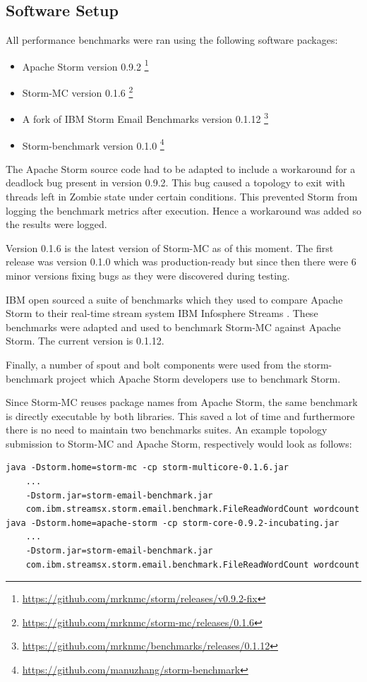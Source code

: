 \documentclass[bsc,logo,frontabs,twoside,singlespacing,normalheadings,parskip]{infthesis}\usepackage[]{graphicx}\usepackage[]{color}
\begin{document}
\subsection{Software Setup}

All performance benchmarks were ran using the following software packages:

\begin{itemize}
	\item Apache Storm version 0.9.2 \footnote{\url{https://github.com/mrknmc/storm/releases/v0.9.2-fix}}
	\item Storm-MC version 0.1.6 \footnote{\url{https://github.com/mrknmc/storm-mc/releases/0.1.6}}
	\item A fork of IBM Storm Email Benchmarks version 0.1.12 \footnote{\url{https://github.com/mrknmc/benchmarks/releases/0.1.12}}
	\item Storm-benchmark version 0.1.0 \footnote{\url{https://github.com/manuzhang/storm-benchmark}}
\end{itemize}

The Apache Storm source code had to be adapted to include a workaround for a deadlock bug present in version 0.9.2. This bug caused a topology to exit with threads left in Zombie state under certain conditions. This prevented Storm from logging the benchmark metrics after execution. Hence a workaround was added so the results were logged.

Version 0.1.6 is the latest version of Storm-MC as of this moment. The first release was version 0.1.0 which was production-ready but since then there were 6 minor versions fixing bugs as they were discovered during testing.

IBM open sourced a suite of benchmarks which they used to compare Apache Storm to their real-time stream system IBM Infosphere Streams \citep{InfoSphereStreams}. These benchmarks were adapted and used to benchmark Storm-MC against Apache Storm. The current version is 0.1.12.

Finally, a number of spout and bolt components were used from the storm-benchmark project which Apache Storm developers use to benchmark Storm.

Since Storm-MC reuses package names from Apache Storm, the same benchmark is directly executable by both libraries. This saved a lot of time and furthermore there is no need to maintain two benchmarks suites. An example topology submission to Storm-MC and Apache Storm, respectively would look as follows:

\begin{verbatim}
java -Dstorm.home=storm-mc -cp storm-multicore-0.1.6.jar
    ...
    -Dstorm.jar=storm-email-benchmark.jar
    com.ibm.streamsx.storm.email.benchmark.FileReadWordCount wordcount
java -Dstorm.home=apache-storm -cp storm-core-0.9.2-incubating.jar
    ...
    -Dstorm.jar=storm-email-benchmark.jar
    com.ibm.streamsx.storm.email.benchmark.FileReadWordCount wordcount
\end{verbatim}
\end{document}
